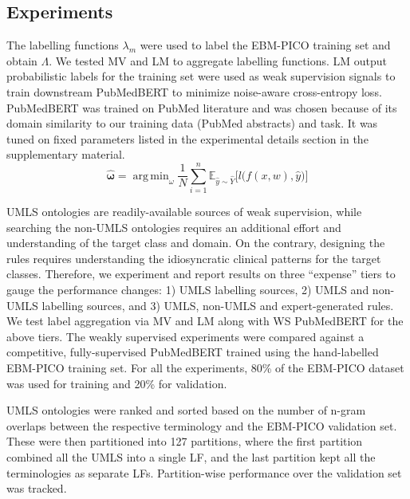 \documentclass[10.7pt,]{article}
\DeclareMathOperator*{\argmin}{arg\,min}
\begin{document}
\subsection{Experiments}\label{subsec:experiments}
%
The labelling functions $\lambda_{m}$ were used to label the EBM-PICO training set and obtain $\Lambda$. 
We tested MV and LM to aggregate labelling functions.
LM output probabilistic labels for the training set were used as weak supervision signals to train downstream PubMedBERT to minimize noise-aware cross-entropy loss.
PubMedBERT was trained on PubMed literature and was chosen because of its domain similarity to our training data (PubMed abstracts) and task.\cite{gu2021domain}
It was tuned on fixed parameters listed in the experimental details section in the supplementary material. 
%
\begin{equation}
\bm{\hat{\omega}} = \argmin_{\omega} \frac{1}{N} \sum_{i=1}^{n} \mathbb{ E }_{ \hat{y} \sim \hat{Y}} \big[ l \big( f(x, w), \hat{y} \big) \big]
\end{equation}
%

UMLS ontologies are readily-available sources of weak supervision, while searching the non-UMLS ontologies requires an additional effort and understanding of the target class and domain.
On the contrary, designing the rules requires understanding the idiosyncratic clinical patterns for the target classes.
Therefore, we experiment and report results on three ``expense'' tiers to gauge the performance changes: 1) UMLS labelling sources, 2) UMLS and non-UMLS labelling sources, and 3) UMLS, non-UMLS and expert-generated rules.
We test label aggregation via MV and LM along with WS PubMedBERT for the above tiers.
The weakly supervised experiments were compared against a competitive, fully-supervised PubMedBERT trained using the hand-labelled EBM-PICO training set.
For all the experiments, 80\% of the EBM-PICO dataset was used for training and 20\% for validation.


UMLS ontologies were ranked and sorted based on the number of n-gram overlaps between the respective terminology and the EBM-PICO validation set.
These were then partitioned into 127 partitions, where the first partition combined all the UMLS into a single LF, and the last partition kept all the terminologies as separate LFs.
Partition-wise performance over the validation set was tracked.
%
%
%
\end{document}
